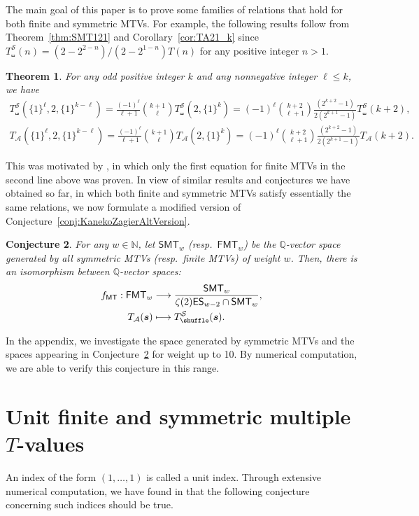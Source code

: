\documentclass{article}
\newcommand{\FMTV}{\mathsf {FMT}}
\newcommand{\ES}{\mathsf {ES}}
\newcommand{\MTV}{\mathsf {MT}}
\newcommand{\SMTV}{\mathsf {SMT}}
\newcommand{\sha}{\shuffle}
\newcommand{\Sy}{{\mathcal S}}
\newcommand{\bfs}{{\boldsymbol{\sl{s}}}}
\newcommand{\calA}{\mathcal{A}}
\newcommand{\N}{\mathbb{N}}
\newcommand{\Q}{\mathbb{Q}}
\theoremstyle{plain}
\newtheorem{thm}{Theorem}[section]
\newtheorem{conj}[thm]{Conjecture}
\theoremstyle{definition}
\begin{document}
The main goal of this paper is to prove some families of relations that hold for both finite and symmetric MTVs. For example, the following results follow from Theorem~\ref{thm:SMT121} and Corollary~\ref{cor:TA21_k} since $T_\sha^\Sy(n)=(2-2^{2-n})/(2-2^{1-n})T(n)$ for any positive integer $n>1$.
\begin{thm}
For any odd positive integer $k$ and any nonnegative integer $\ell\le k$, we have
\begin{align*}
T_\sha^\Sy(\{1\}^\ell,2,\{1\}^{k-\ell})=\frac{(-1)^{\ell}}{\ell+1} \binom{k+1}{\ell}  T_\sha^\Sy(2,\{1\}^k)= (-1)^{\ell} \binom{k+2}{\ell+1} \frac{(2^{k+2}-1)}{2(2^{k+1}-1)} T_\sha^\Sy(k+2),\\
T_\calA(\{1\}^\ell,2,\{1\}^{k-\ell})=\frac{(-1)^{\ell}}{\ell+1} \binom{k+1}{\ell}  T_\calA(2,\{1\}^k)= (-1)^{\ell} \binom{k+2}{\ell+1} \frac{(2^{k+2}-1)}{2(2^{k+1}-1)}T_\calA(k+2).
\end{align*}
\end{thm}

This was motivated by \cite[Prop. 3]{Zhao2023Dec}, in which only the first equation for finite MTVs in the second line above was proven.
In view of similar results and conjectures we have obtained so far, in which both finite and symmetric MTVs satisfy essentially the same relations, we now formulate a modified version of Conjecture~\ref{conj:KanekoZagierAltVersion}.

\begin{conj}\label{conj:KanekoZagierMTV}
For any $w\in\N$, let $\SMTV_{w}$ (resp.\ $\FMTV_w$) be the $\Q$-vector space generated by
all symmetric MTVs (resp.\ finite MTVs) of weight $w$. Then, there is an isomorphism between $\Q$-vector spaces:
\begin{align*}
f_\MTV: \FMTV_{w} & \longrightarrow \frac{\SMTV_w}{\zeta(2)\ES_{w-2}\cap \SMTV_w},  \\
 T_{\calA}(\bfs) & \longmapsto T_\sha^\Sy(\bfs).
\end{align*}
\end{conj}

In the appendix, we investigate the space generated by symmetric MTVs and the spaces appearing in Conjecture~\ref{conj:KanekoZagierMTV} for weight up to 10. By numerical computation, we are able to verify this conjecture in this range.

\section{Unit finite and symmetric multiple $T$-values}
An index of the form $(1,\dots,1)$ is called a unit index. Through extensive numerical computation, we have found in \cite{Zhao2023Dec} that the following conjecture concerning such indices should be true.
\end{document}
